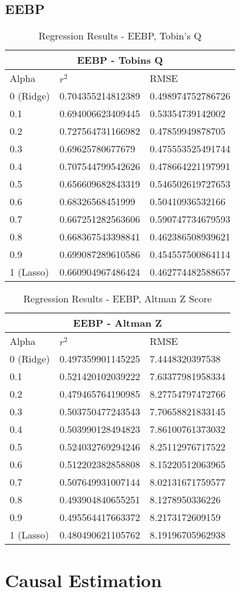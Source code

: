 \subsection{EEBP}
\begin{table}[h!]
\centering
\begin{tabular}{ |p{2.5cm}||p{4cm}|p{4cm}| }
 \hline
 \multicolumn{3}{|c|}{EEBP - Tobins Q} \\
 \hline
 Alpha & $r^2$ & RMSE \\
 \hline
0 (Ridge) & 0.704355214812389 & 0.498974752786726\\
0.1 & 0.694006623409445 & 0.53354739142002\\
0.2 & 0.727564731166982 & 0.47859949878705\\
0.3 & 0.69625780677679 & 0.475553525491744\\
0.4 & 0.707544799542626 & 0.478664221197991\\
0.5 & 0.656609682843319 & 0.546502619727653\\
0.6 & 0.68326568451999 & 0.50410936532166\\
0.7 & 0.667251282563606 & 0.590747734679593\\
0.8 & 0.668367543398841 & 0.462386508939621\\
0.9 & 0.699087289610586 & 0.454557500864114\\
1 (Lasso) & 0.660904967486424 & 0.462774482588657\\
 \hline
\end{tabular}
\caption{Regression Results  - EEBP, Tobin's Q}
\end{table}

\begin{table}[h!]
\centering
\begin{tabular}{ |p{2.5cm}||p{4cm}|p{4cm}| }
 \hline
 \multicolumn{3}{|c|}{EEBP - Altman Z} \\
 \hline
 Alpha & $r^2$ & RMSE \\
 \hline
0 (Ridge) & 0.497359901145225 & 7.4448320397538\\
0.1 & 0.521420102039222 & 7.63377981958334\\
0.2 & 0.479465764190985 & 8.27754797472766\\
0.3 & 0.503750477243543 & 7.70658821833145\\
0.4 & 0.503990128494823 & 7.86100761373032\\
0.5 & 0.524032769294246 & 8.25112976717522\\
0.6 & 0.512202382858808 & 8.15220512063965\\
0.7 & 0.507649931007144 & 8.02131671759577\\
0.8 & 0.493904840655251 & 8.1278950336226\\
0.9 & 0.495564417663372 & 8.2173172609159\\
1 (Lasso) & 0.480490621105762 & 8.19196705962938\\
 \hline
\end{tabular}
\caption{Regression Results  - EEBP, Altman Z Score}
\end{table}

\clearpage
\section{Causal Estimation}\label{S.causal4}


